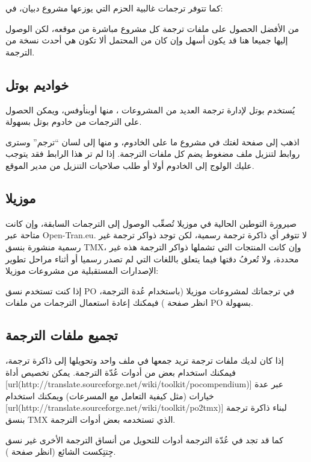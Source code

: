 
كما تتوفر ترجمات غالبية الحزم التي يوزعها مشروع دبيان، في:


من الأفضل الحصول على ملفات ترجمة كل مشروع مباشرة من موقعه، لكن الوصول
إليها جميعا هنا قد يكون أسهل وإن كان من المحتمل ألا تكون هي أحدث نسخة
من الترجمة.

\subsection{خواديم بوتل}
يُستخدم بوتل لإدارة ترجمة العديد من المشروعات ، منها أوبن​أوفس، ويمكن
الحصول على الترجمات من خادوم بوتل بسهولة.

اذهب إلى صفحة لغتك في مشروع ما على الخادوم، و منها إلى لسان “ترجم” وسترى
روابط لتنزيل ملف مضغوط يضم كل ملفات الترجمة. إذا لم تر هذا الرابط فقد
يتوجب عليك الولوج إلى الخادوم أولا أو طلب صلاحيات التنزيل من مدير
الموقع.

\subsection{موزيلا}
صيرورة التوطين الحالية في موزيلا تُصعِّب الوصول إلى الترجمات السابقة،
وإن كانت متاحة عبر Open-Tran.eu. لا تتوفر أي ذاكرة ترجمة رسمية، لكن
توجد ذواكر ترجمة غير رسمية منشورة بنسق TMX، وإن كانت المنتجات التي
تشملها ذواكر الترجمة هذه غير محددة، ولا تُعرفُ دقتها فيما يتعلق باللغات
التي لم تصدر رسميا أو أثناء مراحل تطوير الإصدارات المستقبلية من مشروعات
موزيلا:


إذا كنت تستخدم نسق PO في ترجماتك لمشروعات موزيلا (باستخدام عُدة الترجمة،
انظر صفحة \at[ref:20165030]) فيمكنك إعادة استعمال الترجمات من
ملفات PO بسهولة.

\subsection{تجميع ملفات الترجمة}
إذا كان لديك ملفات ترجمة تريد جمعها في ملف واحد وتحويلها إلى ذاكرة
ترجمة، فيمكنك استخدام بعض من أدوات عُدّة الترجمة. يمكن تخصيص أداة
[url(http://translate.sourceforge.net/wiki/toolkit/pocompendium)]
عبر عدة خيارات (مثل كيفية التعامل مع المسرعات) ويمكنك استخدام
[url(http://translate.sourceforge.net/wiki/toolkit/po2tmx)]
لبناء ذاكرة ترجمة بنسق TMX الذي تستخدمه بعض أدوات الترجمة.

كما قد تجد في عُدّة الترجمة أدوات للتحويل من أنساق الترجمة الأخرى غير
نسق جِتتِكست الشائع (انظر صفحة \at[ref:20165030]).

